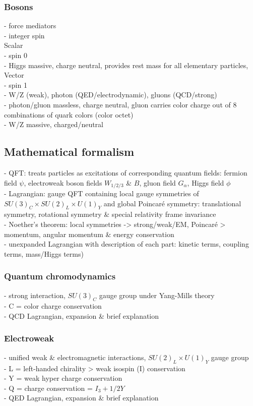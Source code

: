 \documentclass[../thesis.tex]{subfiles}
\begin{document}
\subsubsection*{Bosons}
- force mediators\\
- integer spin\\
Scalar\\
- spin 0\\
- Higgs massive, charge neutral, provides rest mass for all elementary particles,\\
Vector\\
- spin 1\\
- W/Z (weak), photon (QED/electrodynamic), gluons (QCD/strong)\\
- photon/gluon massless, charge neutral, gluon carries color charge out of 8 combinations of quark colors (color octet)\\
- W/Z massive, charged/neutral

\subsection{Mathematical formalism}
- QFT: treats particles as excitations of corresponding quantum fields: fermion field $\psi$, electroweak boson fields $W_{1/2/3}$ \& $B$, gluon field $G_\alpha$, Higgs field $\phi$\\
- Lagrangian: gauge QFT containing local gauge symmetries of $SU(3)_C \times SU(2)_L \times U(1)_Y$ and global Poincaré symmetry: translational symmetry, rotational symmetry \& special relativity frame invariance\\
- Noether's theorem: local symmetries -> strong/weak/EM, Poincaré > momentum, angular momentum \& energy conservation\\
- unexpanded Lagrangian with description of each part: kinetic terms, coupling terms, mass/Higgs terms)

\subsubsection*{Quantum chromodynamics}
- strong interaction, $SU(3)_C$ gauge group under Yang-Mills theory \\
- C = color charge conservation \\
- QCD Lagrangian, expansion \& brief explanation

\subsubsection*{Electroweak}
- unified weak \& electromagnetic interactions, $SU(2)_L \times U(1)_Y$ gauge group\\
- L = left-handed chirality > weak isospin (I) conservation\\
- Y = weak hyper charge conservation\\
- Q = charge conservation = $I_3 + 1/2 Y$\\
- QED Lagrangian, expansion \& brief explanation
\end{document}
